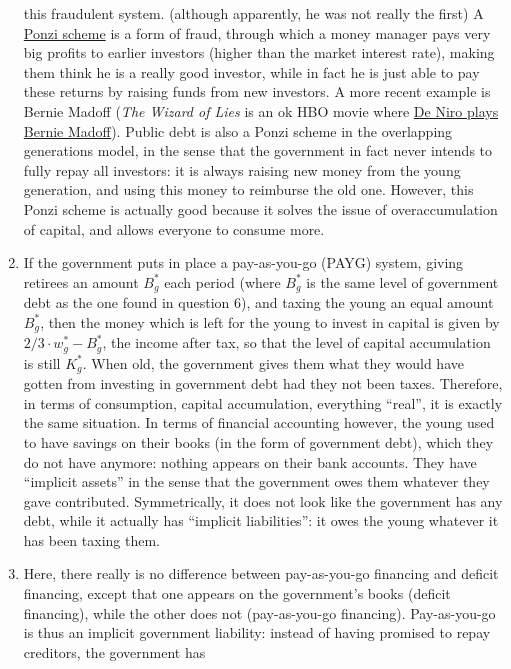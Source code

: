 \documentclass[]{book}
\begin{document}
\begin{enumerate}
  this fraudulent system. (although apparently, he was not really the
  first) A \href{https://en.wikipedia.org/wiki/Ponzi_scheme}{Ponzi
  scheme} is a form of fraud, through which a money manager pays very
  big profits to earlier investors (higher than the market interest
  rate), making them think he is a really good investor, while in fact
  he is just able to pay these returns by raising funds from new
  investors. A more recent example is Bernie Madoff (\emph{The Wizard of
  Lies} is an ok HBO movie where
  \href{https://www.youtube.com/watch?v=7JcZ8QFn6U0}{De Niro plays
  Bernie Madoff}). Public debt is also a Ponzi scheme in the overlapping
  generations model, in the sense that the government in fact never
  intends to fully repay all investors: it is always raising new money
  from the young generation, and using this money to reimburse the old
  one. However, this Ponzi scheme is actually good because it solves the
  issue of overaccumulation of capital, and allows everyone to consume
  more.
\item
  If the government puts in place a pay-as-you-go (PAYG) system, giving
  retirees an amount \(B^{*}_g\) each period (where \(B^{*}_g\) is the
  same level of government debt as the one found in question 6), and
  taxing the young an equal amount \(B^{*}_g\), then the money which is
  left for the young to invest in capital is given by
  \(2/3 \cdot w^{*}_g - B^{*}_g\), the income after tax, so that the
  level of capital accumulation is still \(K^{*}_g\). When old, the
  government gives them what they would have gotten from investing in
  government debt had they not been taxes. Therefore, in terms of
  consumption, capital accumulation, everything ``real'', it is exactly
  the same situation. In terms of financial accounting however, the
  young used to have savings on their books (in the form of government
  debt), which they do not have anymore: nothing appears on their bank
  accounts. They have ``implicit assets'' in the sense that the
  government owes them whatever they gave contributed. Symmetrically, it
  does not look like the government has any debt, while it actually has
  ``implicit liabilities'': it owes the young whatever it has been
  taxing them.
\item
  Here, there really is no difference between pay-as-you-go financing
  and deficit financing, except that one appears on the government's
  books (deficit financing), while the other does not (pay-as-you-go
  financing). Pay-as-you-go is thus an implicit government liability:
  instead of having promised to repay creditors, the government has

\end{enumerate}
\end{document}

